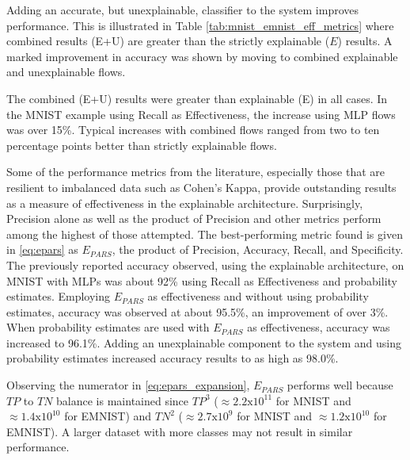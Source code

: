 Adding an accurate, but unexplainable, classifier to the system improves
performance. This is illustrated in Table \ref{tab:mnist_emnist_eff_metrics}
where combined results (E+U) are greater than the strictly explainable ($E$)
results. A marked improvement in accuracy was shown by moving to combined
explainable and unexplainable flows.

The combined (E+U) results were greater than explainable (E) in all cases.
In the MNIST example using Recall as Effectiveness, the increase using MLP flows
was over 15\%.  Typical increases with combined flows ranged from two to ten
percentage points better than strictly explainable flows.

Some of the performance metrics from the literature, especially those that are
resilient to imbalanced data such as Cohen's Kappa, provide outstanding results
as a measure of effectiveness in the explainable architecture. Surprisingly,
Precision alone as well as the product of Precision and other metrics perform
among the highest of those attempted. The best-performing metric found is given
in \eqref{eq:epars} as $E_{PARS}$, the product of Precision, Accuracy, Recall,
and Specificity.  The previously reported accuracy observed, using the
explainable architecture, on MNIST with MLPs was about 92\% using Recall as
Effectiveness and probability estimates. Employing $E_{PARS}$ as effectiveness
and without using probability estimates, accuracy was observed at about 95.5\%,
an improvement of over 3\%. When probability estimates are used with $E_{PARS}$
as effectiveness, accuracy was increased to 96.1\%.  Adding an unexplainable
component to the system and using probability estimates increased accuracy
results to as high as 98.0\%. 

Observing the numerator in \eqref{eq:epars_expansion}, $E_{PARS}$
performs well because $TP$ to $TN$ balance is maintained since $TP^3$
($\approx2.2\text{x}10^{11}$ for MNIST and $\approx1.4\text{x}10^{10}$ for
EMNIST) and $TN^2$ ($\approx2.7\text{x}10^9$ for MNIST and
$\approx1.2\text{x}10^{10}$ for EMNIST).  A larger dataset with more classes may
not result in similar performance.

